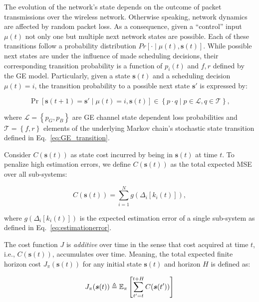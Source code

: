 The evolution of the network's state depends on the outcome of packet
transmissions over the wireless network. Otherwise speaking, network dynamics
are affected by random packet loss. As a consequence, given a ``control'' input
$\mu(t)$ not only one but multiple next network states are possible. Each of
these transitions follow a probability distribution $Pr\left[\cdot\mid\mu(t),
\boldsymbol{s}(t) \right]$. While possible next states are under the influence
of made scheduling decisions, their corresponding transition probability is a
function of $p_i(t)$ and $f,r$ defined by the GE model. Particularly, given a
state $\boldsymbol{s}(t)$ and a scheduling decision $\mu(t)=i$, the transition
probability to a possible next state $\boldsymbol{s'}$ is expressed by:

\begin{equation}
  \label{eq:transition}
  \Pr \left[ \boldsymbol{s}(t+1)=\boldsymbol{s}' \mid \mu(t)=i,\boldsymbol{s}(t)
  \right] \in \left\{ p \cdot q \mid p\in\mathcal{L},q\in\mathcal{T} \right\},
\end{equation}

where $\mathcal{L}=\left\{p_G,p_B\right\}$ are GE channel state dependent loss
probabilities and $\mathcal{T}=\left\{f,r\right\}$ elements of the underlying
Markov chain's stochastic state transition defined in
Eq.~\eqref{eq:GE_transition}.

Consider $C(\boldsymbol{s}(t))$ as state cost incurred by being in
$\boldsymbol{s}(t)$ at time $t$. To penalize high estimation errors, we define
$C(\boldsymbol{s}(t))$ as the total expected MSE over all sub-systems:

\begin{equation}
  \label{eq:gfunction}
  C(\boldsymbol{s}(t)) =  \sum_{i=1}^{N}  g(\Delta_i[k_i(t)]),
\end{equation}

where $g(\Delta_i[k_i(t)])$ is the expected estimation error of a single
sub-system as defined in Eq.~\eqref{eq:estimationerror}. 

The cost function $J$ is \textit{additive} over time in the sense that cost
acquired at time $t$, i.e., $C(\boldsymbol{s}(t))$, accumulates over time.
Meaning, the total expected finite horizon cost $J_{\pi}(\boldsymbol{s} (t))$
for any initial state $\boldsymbol{s}(t)$ and horizon $H$ is defined as:

\begin{equation}
  \label{eq:horizoncost}	
  J_\pi(\boldsymbol{s}(t)) \triangleq \mathbb{E}_\pi \left[ \sum_{t' = t }^{t + H} C(\boldsymbol{s}(t')) \right] 
\end{equation}


